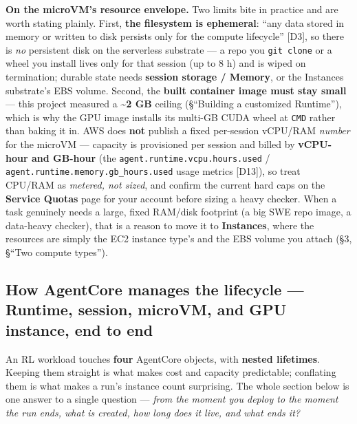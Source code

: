 \documentclass[
  paper=a4,
  ,captions=tableheading
]{scrartcl}
\begin{document}
\textbf{On the microVM's resource envelope.} Two limits bite in practice
and are worth stating plainly. First, \textbf{the filesystem is
ephemeral}: ``any data stored in memory or written to disk persists only
for the compute lifecycle'' {[}D3{]}, so there is \emph{no} persistent
disk on the serverless substrate --- a repo you \texttt{git\ clone} or a
wheel you install lives only for that session (up to 8 h) and is wiped
on termination; durable state needs \textbf{session storage / Memory},
or the Instances substrate's EBS volume. Second, the \textbf{built
container image must stay small} --- this project measured a
\textbf{\textasciitilde2 GB} ceiling (§``Building a customized
Runtime''), which is why the GPU image installs its multi-GB CUDA wheel
at \texttt{CMD} rather than baking it in. AWS does \textbf{not} publish
a fixed per-session vCPU/RAM \emph{number} for the microVM --- capacity
is provisioned per session and billed by \textbf{vCPU-hour and GB-hour}
(the \texttt{agent.runtime.vcpu.hours.used} /
\texttt{agent.runtime.memory.gb\_hours.used} usage metrics {[}D13{]}),
so treat CPU/RAM as \emph{metered, not sized}, and confirm the current
hard caps on the \textbf{Service Quotas} page for your account before
sizing a heavy checker. When a task genuinely needs a large, fixed
RAM/disk footprint (a big SWE repo image, a data-heavy checker), that is
a reason to move it to \textbf{Instances}, where the resources are
simply the EC2 instance type's and the EBS volume you attach (§3, §``Two
compute types'').

\hypertarget{how-agentcore-manages-the-lifecycle-runtime-session-microvm-and-gpu-instance-end-to-end}{%
\subsection{How AgentCore manages the lifecycle --- Runtime, session,
microVM, and GPU instance, end to
end}\label{how-agentcore-manages-the-lifecycle-runtime-session-microvm-and-gpu-instance-end-to-end}}

An RL workload touches \textbf{four} AgentCore objects, with
\textbf{nested lifetimes}. Keeping them straight is what makes cost and
capacity predictable; conflating them is what makes a run's instance
count surprising. The whole section below is one answer to a single
question --- \emph{from the moment you deploy to the moment the run
ends, what is created, how long does it live, and what ends it?}
\end{document}
